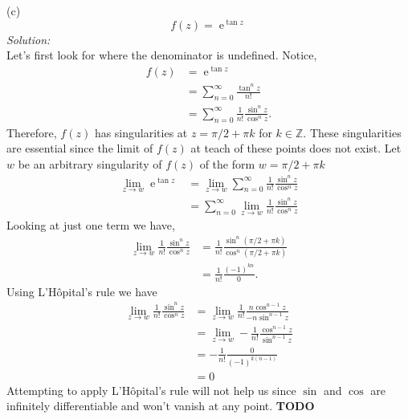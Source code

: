 \documentclass[10pt]{amsart}
\DeclareMathOperator{\E}{e}
\theoremstyle{nonumberplain}
\begin{document}
\begin{enumerate}[label={\bf {\arabic*}:}]
\noindent
(c)
$$
f(z) = \E^{\tan z}
$$
\textit{Solution:} \\
Let's first look for where the denominator is undefined.
Notice,
\begin{align*}
f(z) &= \E^{\tan z} \\
	&= \sum_{n=0}^\infty \frac {\tan^n z} {n!} \\
	&= \sum_{n=0}^\infty \frac 1 {n!} \frac {\sin^n z} {\cos^n z}.
\end{align*}
Therefore, $f(z)$ has singularities at $z = \pi/2 + \pi k$ for $k \in \mathbb Z$.
These singularities are essential since the limit of $f(z)$ at teach of these points does not exist.
Let $w$ be an arbitrary singularity of $f(z)$ of the form $w = \pi/2 + \pi k$
\begin{align*}
\lim_{z\rightarrow w} \E^{\tan z}
	&= \lim_{z\rightarrow w} \sum_{n=0}^\infty \frac 1 {n!} \frac {\sin^n z} {\cos^n z} \\
	&= \sum_{n=0}^\infty \lim_{z\rightarrow w} \frac 1 {n!} \frac {\sin^n z} {\cos^n z}
\end{align*}
Looking at just one term we have,
\begin{align*}
\lim_{z\rightarrow w} \frac 1 {n!} \frac {\sin^n z} {\cos^n z}
	&= \frac 1 {n!} \frac {\sin^n (\pi/2 + \pi k)} {\cos^n (\pi/2 + \pi k)} \\
	&= \frac 1 {n!} \frac {(-1)^{kn}} {0}.
\end{align*}
Using L'Hôpital's rule we have
\begin{align*}
\lim_{z\rightarrow w} \frac 1 {n!} \frac {\sin^n z} {\cos^n z}
	&= \lim_{z\rightarrow w} \frac 1 {n!} \frac {n\cos^{n - 1} z} {-n\sin^{n - 1} z} \\
	&= \lim_{z\rightarrow w} -\frac 1 {n!} \frac {\cos^{n - 1} z} {\sin^{n - 1} z} \\
	&= -\frac 1 {n!} \frac {0} {(-1)^{k(n - 1)}} \\
	&= 0
\end{align*}
Attempting to apply L'Hôpital's rule will not help us since $\sin$ and $\cos$ are infinitely differentiable and won't vanish at any point.
\textbf{TODO} \\


\end{enumerate}
\end{document}
